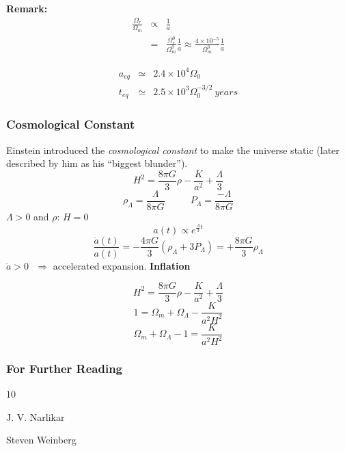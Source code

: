 \documentclass[xcolor=dvipsnames]{beamer}
\begin{document}
\begin{frame}

{\bf Remark:}
\begin{eqnarray}
\frac{\Omega_r}{\Omega_m} &\propto& \frac{1}{a} \nonumber\\
&=& \frac{\Omega_r^0}{\Omega_m^0}\frac{1}{a} \approx
\frac{4\times 10^{-5}}{\Omega_m^0}\frac{1}{a} \nonumber
\end{eqnarray}

\begin{eqnarray}
a_{eq} &\simeq& 2.4\times 10^4\Omega_0 \nonumber\\
t_{eq} &\simeq& 2.5\times 10^3\Omega_0^{-3/2}~years \nonumber
\end{eqnarray}
\end{frame}

\begin{frame}
\frametitle{Cosmological Constant}
Einstein introduced the {\em cosmological constant} to make the universe
static (later described by him as his ``biggest blunder'').
\[ H^2 = \frac{8\pi G}{3}\rho - \frac{K}{a^2} + \frac{\Lambda}{3} \]
\[ \rho_\Lambda = \frac{\Lambda}{8\pi G}~~~~~~~~~~~~
P_\Lambda = \frac{-\Lambda}{8\pi G} \]
$\Lambda > 0$ and $\rho$:  $H=0$
\[ a(t) \propto e^{\frac{\Lambda}{3}t} \]
\[ \frac{\ddot{a}(t)}{a(t)} = -\frac{4\pi G}{3}\left(\rho_\Lambda+3P_\Lambda
\right) = + \frac{8\pi G}{3}\rho_\Lambda  \]
$\ddot{a} > 0~~~\Rightarrow$ accelerated expansion. {\bf Inflation}
\end{frame}

\begin{frame}
\[ H^2 = \frac{8\pi G}{3}\rho - \frac{K}{a^2} + \frac{\Lambda}{3} \]
\[ 1 = \Omega_m + \Omega_\Lambda - \frac{K}{a^2H^2} \]
\[ \boxed{ \Omega_m + \Omega_\Lambda - 1 = \frac{K}{a^2H^2} }\]
\end{frame}

\begin{frame}
  \frametitle<presentation>{For Further Reading}
    
  \begin{thebibliography}{10}
    
  \beamertemplatebookbibitems

    J. V. Narlikar

     Steven Weinberg

  \end{thebibliography}
\end{frame}
\end{document}
